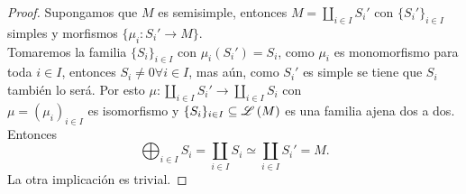 \documentclass{article}
\begin{document}
\begin{enumerate}[label=\textbf{Ej \arabic*.}]
\begin{proof}
			 Supongamos que $M$ es semisimple, entonces $M=\displaystyle\coprod_{i\in I}S_i'$ con $\{S_i'\}_{i\in I}$ simples y 
			morfismos $\{\mu_i\colon S_i'\longrightarrow M\}$.\\
			Tomaremos la familia $\{S_i\}_{i\in I}$ con $\mu_i(S_i')=S_i$, como $\mu_i$ es monomorfismo para toda $i\in I$, entonces
			$S_i\neq 0$\quad $\forall i\in I$, mas aún, como $S_i'$ es simple se tiene que $S_i $ también lo será. Por esto
			$\mu:\displaystyle\coprod_{i\in I}S_i'\longrightarrow \displaystyle\coprod_{i\in I}S_i$ con \\$\mu=(\mu_i)_{i\in I}$ es isomorfismo
			y $\{S_i\}_{i\in I}\subseteq\mathscr{L}\left(M\right)$ es una familia ajena dos a dos. Entonces 
			\[\bigoplus_{i\in I}S_i=\coprod_{i\in I}S_i\simeq \coprod_{i\in I}S_i'=M.\]
			La otra implicación es trivial.
		\end{proof}
	\end{enumerate}
\end{document}
